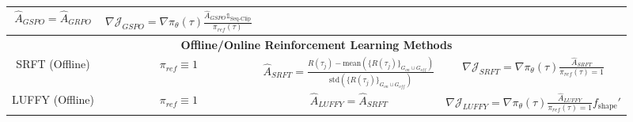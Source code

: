 \begin{table}[!t]
{\begin{tabular}{cccc}
        $\hat{A}_{GSPO} = \hat{A}_{GRPO}$ & 
        $\nabla \mathcal{J}_{GSPO} = \nabla \pi_\theta (\tau) \frac{\hat{A}_{GSPO} \mathbb{1}_{\text{Seq-Clip}}}{\pi_{ref} (\tau)}$\\
        \midrule
        \multicolumn{4}{c}{\textbf{Offline/Online Reinforcement Learning Methods}} \\
        \midrule
         \makecell{SRFT (Offline)\\\citep{fu2025srft}} & $\pi_{ref} \equiv 1$&
        $\hat{A}_{SRFT} = \frac{R(\tau_{j}) - \text{mean} (\{R(\tau_{j})\}_{G_{on}\cup G_{off}})}{\text{std} (\{R(\tau_{j})\}_{G_{on}\cup G_{off}})}$ & 
        $\nabla \mathcal{J}_{SRFT} = \nabla \pi_\theta (\tau) \frac{\hat{A}_{SRFT}}{\pi_{ref} (\tau) = 1}$\\
        \midrule
         \makecell{LUFFY (Offline)\\\citep{yan2025learning}} & $\pi_{ref} \equiv 1$&
        $\hat{A}_{LUFFY} = \hat{A}_{SRFT}$ & 
        $\nabla \mathcal{J}_{LUFFY} = \nabla \pi_\theta (\tau) \frac{\hat{A}_{LUFFY}}{\pi_{ref} (\tau) = 1} f_{\text{shape}}'$ \\
    \bottomrule
    \end{tabular}
    }
\end{table}
